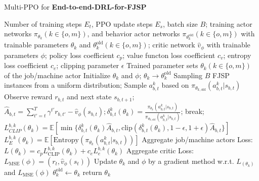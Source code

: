\begin{algorithm}
	\caption{Multi-PPO for \textbf{End-to-end-DRL-for-FJSP}} \label{algorithm:multippo}
	\begin{algorithmic}[1]
	\renewcommand{\algorithmicrequire}{\hspace*{\algorithmicindent}  \textbf{Input:}}
	\renewcommand{\algorithmicensure}{\hspace*{\algorithmicindent}  \textbf{Output:}}
	\Require Number of training steps $E_t$, PPO update steps $E_s$, batch size $B$; training actor networks $\pi_{\theta_k} (k \in \{o,m\})$, and behavior actor networks $\pi_{\theta^\text{old}_k} (k \in \{ o,m\})$ with trainable parameters $\theta_k$ and $\theta^\text{old}_k (k \in \{ o,m \})$; critic network $\hat{v}_\phi$ with trainable parameters $\phi$; policy loss coefficient $c_p$; value functon loss coefficient $c_v$; entropy loss coefficient $c_e$; clipping parameter $\epsilon$
	\Ensure Trained parameter sets $\theta_k (k \in \{ o,m \})$ of the job/machine actor
	\State Initialize $\theta_k$ and $\phi$; $\theta_k \rightarrow \theta^\text{old}_k$ 
		\State Sampling $B$ FJSP instances from a uniform distribution;
			\State Sample $a_{b,t}^k$ based on $\pi_{\theta_{k,\text{old}}} \left( a_{b,t}^k | s_{b,t}\right)$
			\State Observe reward $r_{b,t}$ and next state $s_{b,t+1}$;
			\State $\hat{A}_{b,t} = \sum_{t'=t}^T\gamma^{t'}r_{b,t'} - \hat{v}_\phi(s_{b,t}); \delta_{b,t}^k(\theta_k) = \frac{\pi_{\theta_k}\left(a^k_{b,t} | s_{b,t}\right)}{\pi_{\theta_{k,\text{old}}}\left(a^k_{b,t} | s_{b,t}\right)}$;
                \State break;
            \EndIf
            \EndFor
        \State $L_{CLIP}^{b,k}(\theta_k) = \mathbb{E} \left [ \min \{\delta_{b,t}^k(\theta_k)\hat{A}_{b,t}, \text{clip}\left( \delta_{b,t}^k(\theta_k), 1-\epsilon, 1+\epsilon\right) \hat{A}_{b,t} \} \right ]$
        \State $L_E^{b,k}(\theta_k) = \mathbb{E} \left [ \text{Entropy}\left(\pi_{\theta_k}\left(a_{b,t}^k | s_{b,t}\right)\right)\right ]$
        \State Aggregate job/machine actors Loss: $L(\theta_k) = c_p L_\text{CLIP}^{b,k}(\theta_k) + c_e L_e^{b,k}(\theta_k)$
        \State Aggregate critic Loss: $L_\text{MSE}(\phi)=(r_t, \hat{v}_\phi(s_t))$
		\EndFor
        \State Update $\theta_k$ and $\phi$ by a gradient method w.r.t. $L_(\theta_k)$ and $L_\text{MSE}(\phi)$
    \EndFor
    \State $\theta_k^\text{old} \gets \theta_k$
	\EndFor
	\State return $\theta_k$
\end{algorithmic}
\end{algorithm}

